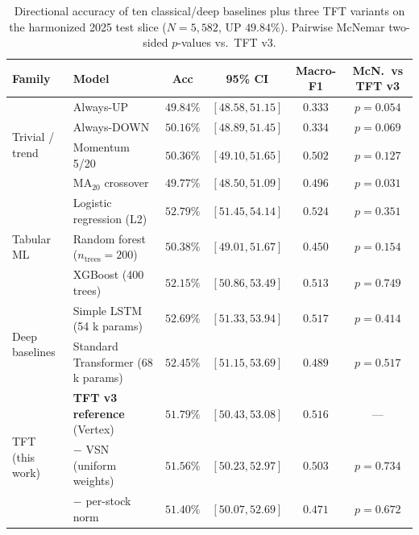 \documentclass[conference]{IEEEtran}
\begin{document}
\begin{table}[htbp]
\centering
\caption{Directional accuracy of ten classical/deep baselines plus three TFT variants on the harmonized 2025 test slice ($N=5{,}582$, UP $49.84\%$). Pairwise McNemar two-sided $p$-values vs.\ TFT v3.}
\label{tab:baselines}
\small
\setlength{\tabcolsep}{4pt}
\begin{tabular}{llcccc}
\toprule
\textbf{Family} & \textbf{Model} & \textbf{Acc} & \textbf{95\% CI} & \textbf{Macro-F1} & \textbf{McN.\ vs TFT v3} \\
\midrule
\multirow{4}{*}{Trivial / trend}
& Always-UP                                       & $49.84\%$ & $[48.58, 51.15]$ & $0.333$ & $p = 0.054$ \\
& Always-DOWN                                     & $50.16\%$ & $[48.89, 51.45]$ & $0.334$ & $p = 0.069$ \\
& Momentum 5/20                                   & $50.36\%$ & $[49.10, 51.65]$ & $0.502$ & $p = 0.127$ \\
& MA$_{20}$ crossover                             & $49.77\%$ & $[48.50, 51.09]$ & $0.496$ & $p = 0.031$ \\
\midrule
\multirow{3}{*}{Tabular ML}
& Logistic regression (L2)                        & $52.79\%$ & $[51.45, 54.14]$ & $\mathbf{0.524}$ & $p = 0.351$ \\
& Random forest ($n_\text{trees}{=}200$)         & $50.38\%$ & $[49.01, 51.67]$ & $0.450$ & $p = 0.154$ \\
& XGBoost (400 trees)                             & $52.15\%$ & $[50.86, 53.49]$ & $0.513$ & $p = 0.749$ \\
\midrule
\multirow{2}{*}{Deep baselines}
& Simple LSTM (54 k params)                       & $52.69\%$ & $[51.33, 53.94]$ & $0.517$ & $p = 0.414$ \\
& Standard Transformer (68 k params)              & $52.45\%$ & $[51.15, 53.69]$ & $0.489$ & $p = 0.517$ \\
\midrule
\multirow{3}{*}{TFT (this work)}
& \textbf{TFT v3 reference} (Vertex)              & $\mathbf{51.79\%}$ & $[50.43, 53.08]$ & $0.516$ & --- \\
& \quad $-$ VSN (uniform weights)                  & $51.56\%$ & $[50.23, 52.97]$ & $0.503$ & $p = 0.734$ \\
& \quad $-$ per-stock norm                         & $51.40\%$ & $[50.07, 52.69]$ & $0.471$ & $p = 0.672$ \\
\bottomrule
\end{tabular}
\end{table}
\end{document}
